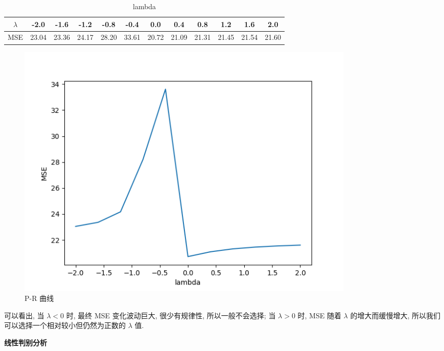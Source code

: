 \documentclass[answers]{exam}  %
\begin{document}
\begin{questions}
\begin{solution}
\begin{enumerate}
            \begin{table}[H]
              \centering
              \caption{lambda} \vspace{2mm}\label{table:roc}
              \begin{tabular}{c|c c c c c c c c c c c}\toprule
                \hline
                $\lambda$ & -2.0  & -1.6  & -1.2  & -0.8  & -0.4  & 0.0   & 0.4   & 0.8   & 1.2   & 1.6   & 2.0   \\ \midrule
                MSE       & 23.04 & 23.36 & 24.17 & 28.20 & 33.61 & 20.72 & 21.09 & 21.31 & 21.45 & 21.54 & 21.60 \\ \midrule
                \bottomrule
              \end{tabular}
            \end{table}

            \begin{figure}[H]
              \centering
              \includegraphics[width=0.8\textwidth]{Figure_1.png}
              \caption{P-R 曲线}
              \label{Fig.main1}
            \end{figure}


            可以看出, 当 $\lambda < 0$ 时, 最终 MSE 变化波动巨大, 很少有规律性, 所以一般不会选择; 当 $\lambda > 0$ 时, MSE 随着 $\lambda$ 的增大而缓慢增大, 所以我们可以选择一个相对较小但仍然为正数的 $\lambda$ 值.
    \end{enumerate}
  \end{solution}

  \question [20] \textbf{线性判别分析}


\end{questions}
\end{document}
